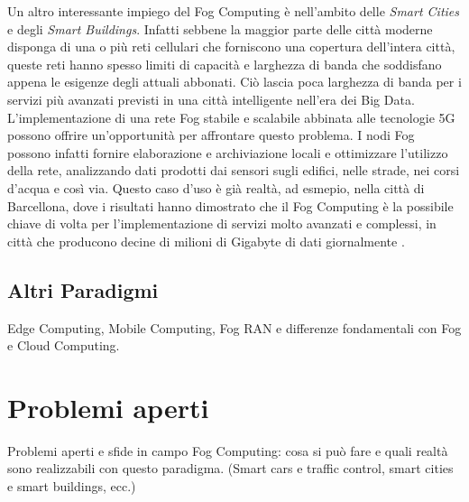 Un altro interessante impiego del Fog Computing è nell'ambito delle \textit{Smart Cities} e degli \textit{Smart Buildings}. Infatti sebbene  la maggior parte delle città moderne disponga di una o più reti cellulari che forniscono una copertura dell'intera città, queste reti hanno spesso limiti di capacità e larghezza di banda che soddisfano appena le esigenze degli attuali abbonati. Ciò lascia poca larghezza di banda per i servizi più avanzati previsti in una città intelligente nell'era dei Big Data. L'implementazione di una rete Fog stabile e scalabile abbinata alle tecnologie 5G possono offrire un'opportunità per affrontare questo problema. I nodi Fog possono infatti fornire elaborazione e archiviazione locali e ottimizzare l'utilizzo della rete, analizzando dati prodotti dai sensori sugli edifici, nelle strade, nei corsi d'acqua e così via. Questo caso d'uso è già realtà, ad esmepio, nella città di Barcellona, dove i risultati hanno dimostrato che il Fog Computing è la possibile chiave di volta per l'implementazione di servizi molto avanzati e complessi, in città che producono decine di milioni di Gigabyte di dati giornalmente \cite{FogBarcellona}. 

\subsection{Altri Paradigmi}

Edge Computing, Mobile Computing, Fog RAN e differenze fondamentali con Fog e Cloud Computing.

\section{Problemi aperti}

Problemi aperti e sfide in campo Fog Computing: cosa si può fare e quali realtà sono realizzabili con questo paradigma. (Smart cars e traffic control, smart cities e smart buildings, ecc.)
